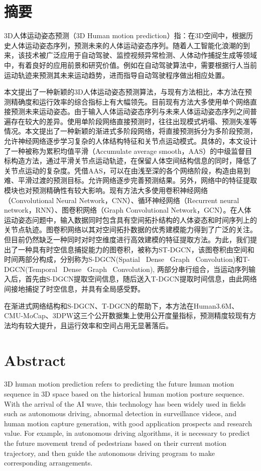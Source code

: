 \chapter{摘\texorpdfstring{\quad}{}要}
	3D人体运动姿态预测（3D Human motion prediction）指：在3D空间中，根据历史人体运动姿态序列，预测未来的人体运动姿态序列。随着人工智能化浪潮的到来，该技术被广泛应用于自动驾驶、监控视频异常检测、人体动作捕捉生成等领域中，有着良好的应用前景和研究价值。例如在自动驾驶算法中，需要根据行人当前运动轨迹来预测其未来运动趋势，进而指导自动驾驶程序做出相应处置。
	
	本文提出了一种新颖的3D人体运动姿态预测算法，与现有方法相比，本方法在预测精确度和运行效率的综合指标上有大幅领先。目前现有方法大多使用单个网络直接预测未来运动姿态。由于输入人体运动姿态序列与未来人体运动姿态序列之间普遍存在较大的差异。使用单阶段网络直接预测时，往往出现模式坍塌、预测失准等情况。本文提出了一种新颖的渐进式多阶段网络，将直接预测拆分为多阶段预测，允许神经网络逐步学习复杂的人体结构特征和关节点运动模式。具体的，本文设计了一种被称为累积均值平滑（Accumulate average smooth，AAS）的中级监督目标构造方法，通过平滑关节点运动轨迹，在保留人体空间结构信息的同时，降低了关节点运动的复杂度。凭借AAS，可以在由浅至深的各个网络阶段，构造由易到难、平滑过渡的预测目标。允许网络逐步完善预测结果。另外，网络中的特征提取模块也对预测精确性有较大影响。现有方法大多使用卷积神经网络（Convolutional Neural Network，CNN）、循环神经网络（Recurrent neural network，RNN）、图卷积网络（Graph Convolutional Network，GCN）。在人体运动姿态问题中，输入数据同时包含具有空间拓扑结构的人体姿态和时间序列上的关节点轨迹。图卷积网络以其对空间拓扑数据的优秀建模能力得到了广泛的关注。但目前仍然缺乏一种同时对时空维度进行高效建模的特征提取方法。为此，我们提出了一种具有时空信息捕捉能力的图卷积，被称为ST-DGCN，该图卷积由空间和时间两部分构成，分别称为S-DGCN(Spatial \ Dense \ Graph \ Convolution)和T-DGCN(Temporal \ Dense \ Graph \ Convolution), 两部分串行组合，当运动序列输入后，首先由S-DGCN提取空间信息，随后送入T-DGCN提取时间信息，由此网络间接地捕捉了时空信息，并具有全局感受野。
		
	在渐进式网络结构和S-DGCN、T-DGCN的帮助下，本方法在Human3.6M、CMU-MoCap、3DPW这三个公开数据集上使用公开度量指标，预测精度较现有方法均有较大提升，且运行效率和空间占用无显著落后。



\chapter{Abstract}
3D human motion prediction refers to predicting the future human motion sequence in 3D space based on the historical human motion posture sequence. With the arrival of the AI wave, this technology has been widely used in fields such as autonomous driving, abnormal detection in surveillance videos, and human motion capture generation, with good application prospects and research value. For example, in autonomous driving algorithms, it is necessary to predict the future movement trend of pedestrians based on their current motion trajectory, and then guide the autonomous driving program to make corresponding arrangements.

